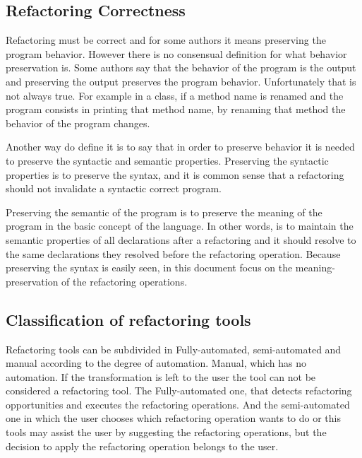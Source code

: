 \subsection{Refactoring Correctness}
Refactoring must be correct and for some authors it means preserving the program behavior. %
However there is no consensual definition for what behavior preservation is.
Some authors say that the behavior of the program is the output and preserving the output preserves the program behavior. 
Unfortunately that is not always true. \cite{erb2010survey} 
For example in a class, if a method name is renamed and the program consists in printing that method name, by renaming that method the behavior of the program changes.

Another way do define it is to say that in order to preserve behavior it is needed to preserve the syntactic and semantic properties.
Preserving the syntactic properties is to preserve the syntax, and it is common sense that a refactoring should not invalidate a syntactic correct program.

Preserving the semantic of the program is to preserve the meaning of the program in the basic concept of the language. 
In other words, is to  maintain the semantic properties of all declarations after a refactoring and it should resolve to the same declarations they resolved before the refactoring operation.
Because preserving the syntax is easily seen, in this document focus on the meaning-preservation of the refactoring operations. 






\subsection{Classification of refactoring tools} %
Refactoring tools can be subdivided in Fully-automated, semi-automated and manual according to the degree of automation.
Manual, which has no automation. If the transformation is left to the user the tool can not be considered a refactoring tool.
The Fully-automated one, that detects refactoring opportunities and executes the refactoring operations. 
And the semi-automated one in which the user chooses which refactoring operation wants to do or this tools may assist the user by suggesting the refactoring operations, but the decision to apply the refactoring operation belongs to the user. \cite{erb2010survey}




